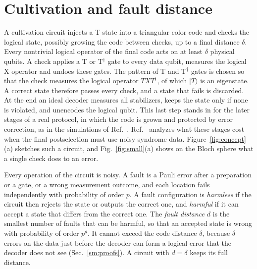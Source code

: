 \documentclass[aps,prl,reprint,twocolumn,amsmath,amssymb,floatfix,nofootinbib,superscriptaddress]{revtex4-2}
\theoremstyle{definition}
\theoremstyle{remark}
\begin{document}
%
\section{Cultivation and fault distance}
A cultivation circuit injects a T state into a triangular color code and checks the logical state, possibly growing the code between checks, up to a final distance $\delta$. Every nontrivial logical operator of the final code acts on at least $\delta$ physical qubits. A check applies a T or T$^\dagger$ gate to every data qubit, measures the logical X operator and undoes these gates. The pattern of T and T$^\dagger$ gates is chosen so that the check measures the logical operator $TXT^\dagger$, of which $|T\rangle$ is an eigenstate. A correct state therefore passes every check, and a state that fails is discarded. At the end an ideal decoder measures all stabilizers, keeps the state only if none is violated, and unencodes the logical qubit. This last step stands in for the later stages of a real protocol, in which the code is grown and protected by error correction, as in the simulations of Ref.~\cite{cultivation}. Ref.~\cite{mehta} analyzes what these stages cost when the final postselection must use noisy syndrome data. Figure~\ref{fig:concept}(a) sketches such a circuit, and Fig.~\ref{fig:small}(a) shows on the Bloch sphere what a single check does to an error.

Every operation of the circuit is noisy. A fault is a Pauli error after a preparation or a gate, or a wrong measurement outcome, and each location fails independently with probability of order $p$. A fault configuration is \emph{harmless} if the circuit then rejects the state or outputs the correct one, and \emph{harmful} if it can accept a state that differs from the correct one. The \emph{fault distance} $d$ is the smallest number of faults that can be harmful, so that an accepted state is wrong with probability of order $p^d$. It cannot exceed the code distance $\delta$, because $\delta$ errors on the data just before the decoder can form a logical error that the decoder does not see (Sec.~\ref{sm:proofs}). A circuit with $d=\delta$ keeps its full distance.

%
\end{document}
